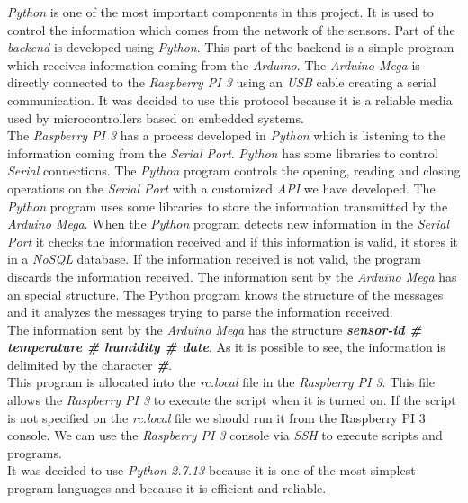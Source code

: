 \textit{Python} is one of the most important components in this project. It is used to control the information which comes from the network of the sensors. Part of the \textit{backend} is developed using \textit{Python}. This part of the backend is a simple program which receives information coming from the \textit{Arduino}. The \textit{Arduino Mega} is directly connected to the \textit{Raspberry PI 3} using an \textit{USB} cable creating a serial communication. It was decided to use this protocol because it is a reliable media used by microcontrollers based on embedded systems.\\

The \textit{Raspberry PI 3} has a process developed in \textit{Python} which is listening to the information coming from the \textit{Serial Port}. \textit{Python} has some libraries to control \textit{Serial} connections. The \textit{Python} program controls the opening, reading and closing operations on the \textit{Serial Port} with a customized \textit{API} we have developed. The \textit{Python} program uses some libraries to store the information transmitted by the \textit{Arduino Mega}. When the \textit{Python} program detects new information in the \textit{Serial Port} it checks the information received and if this information is valid, it stores it in a \textit{NoSQL} database. If the information received is not valid, the program discards the information received. The information sent by the \textit{Arduino Mega} has an special structure. The Python program knows the structure of the messages and it analyzes the messages trying to parse the information received.\\

The information sent by the \textit{Arduino Mega} has the structure \textit{\textbf{sensor-id \# temperature \# humidity \# date}}. As it is possible to see, the information is delimited by the character \textbf{\textit{\#}}.\\

This program is allocated into the \textit{rc.local} file in the \textit{Raspberry PI 3}. This file allows the \textit{Raspberry PI 3} to execute the script when it is turned on. If the script is not specified on the \textit{rc.local} file we should run it from the Raspberry PI 3 console. We can use the \textit{Raspberry PI 3} console via \textit{SSH} to execute scripts and programs.\\

It was decided to use \textit{Python 2.7.13} because it is one of the most simplest program languages and because it is efficient and reliable.


